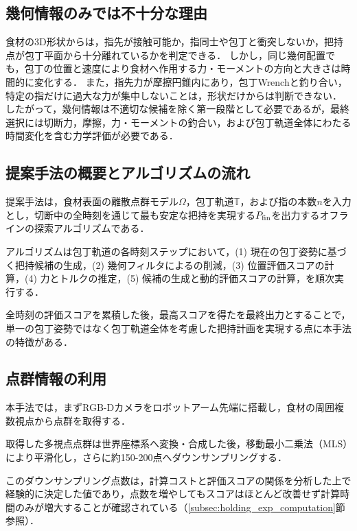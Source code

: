 \begin{revisionblock}
\subsection{幾何情報のみでは不十分な理由}
食材の3D形状からは，指先が接触可能か，指同士や包丁と衝突しないか，把持点が包丁平面から十分離れているかを判定できる．
しかし，同じ幾何配置でも，包丁の位置と速度により食材へ作用する力・モーメントの方向と大きさは時間的に変化する．
また，指先力が摩擦円錐内にあり，包丁Wrenchと釣り合い，特定の指だけに過大な力が集中しないことは，形状だけからは判断できない．
したがって，幾何情報は不適切な候補を除く第一段階として必要であるが，最終選択には切断力，摩擦，力・モーメントの釣合い，および包丁軌道全体にわたる時間変化を含む力学評価が必要である．
\end{revisionblock}


\subsection{提案手法の概要とアルゴリズムの流れ}
\label{subsec:holding_method_overview}

提案手法は，食材表面の離散点群モデル$\Omega$，包丁軌道$\mathbb{T}$，および指の本数$n$を入力とし，切断中の全時刻を通じて最も安定な把持を実現する{\nameholdingpointset}$\equholdingpointset[fin]$を出力するオフラインの探索アルゴリズムである．

アルゴリズムは包丁軌道の各時刻ステップにおいて，(1) 現在の包丁姿勢に基づく把持候補の生成，(2) 幾何フィルタによる{\namesearchspace}の削減，(3) 位置評価スコアの計算，(4) 力とトルクの推定，(5) {\namegraspforce}候補の生成と動的評価スコアの計算，を順次実行する．

全時刻の評価スコアを累積した後，最高スコアを得た{\nameholdingpointset}を最終出力とすることで，単一の包丁姿勢ではなく包丁軌道全体を考慮した把持計画を実現する点に本手法の特徴がある．


\subsection{点群情報の利用}
\label{subsec:holding_pointcloud}

本手法では，まずRGB-Dカメラをロボットアーム先端に搭載し，食材の周囲複数視点から点群を取得する．

取得した多視点点群は世界座標系へ変換・合成した後，移動最小二乗法（MLS）により平滑化し，さらに約150-200点へダウンサンプリングする．

このダウンサンプリング点数は，計算コストと評価スコアの関係を分析した上で経験的に決定した値であり，点数を増やしてもスコアはほとんど改善せず計算時間のみが増大することが確認されている（\ref{subsec:holding_exp_computation}節参照）．

